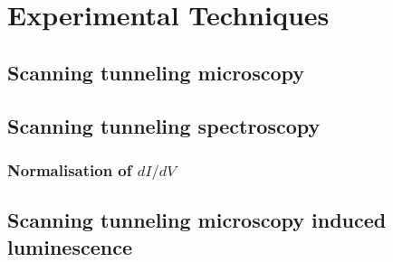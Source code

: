 
\chapter{Experimental Techniques}
\label{ch:exptech}

\section{Scanning tunneling microscopy}


\section{Scanning tunneling spectroscopy}

\subsection{Normalisation of $dI/dV$}



\section{Scanning tunneling microscopy induced luminescence}